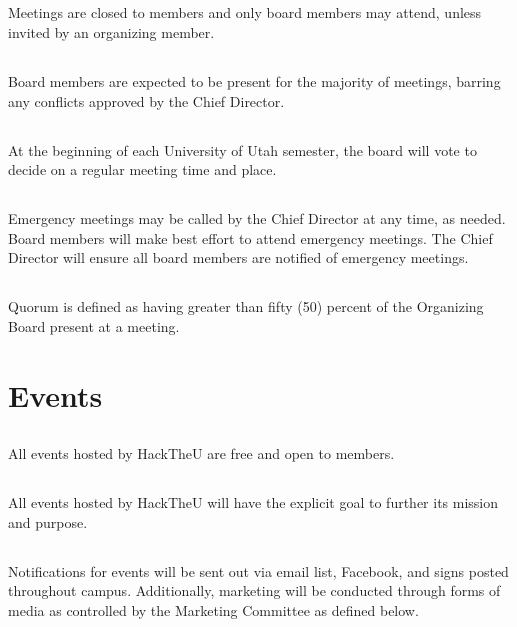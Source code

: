 \documentclass[12pt]{article}
\begin{document}
\subsection{} Meetings are closed to members and only board members may attend, unless invited by an organizing member.
\subsection{} Board members are expected to be present for the majority of meetings, 
barring any conflicts approved by the Chief Director.
\subsection{} At the beginning of each University of Utah semester, the board will vote to decide on a regular meeting time and place.
\subsection{} Emergency meetings may be called by the Chief Director at any time, as needed.
Board members will make best effort to attend emergency meetings.
The Chief Director will ensure all board members are notified of emergency meetings.
\subsection{} Quorum is defined as having greater than fifty (50) percent of the Organizing Board present at a meeting.

\section{Events}

\subsection{} All events hosted by HackTheU are free and open to members.
\subsection{} All events hosted by HackTheU will have the explicit goal to further its mission and purpose.
\subsection{} Notifications for events will be sent out via email list, Facebook, and signs posted throughout campus. 
Additionally, marketing will be conducted through forms of media as controlled by
the Marketing Committee as defined below.
\end{document}
